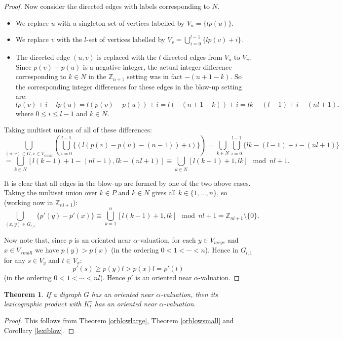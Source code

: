 \documentclass[12pt, a4paper]{article}
\newtheorem{theorem}{Theorem}[section]
\theoremstyle{definition}
\begin{document}
\begin{proof}
Now consider the directed edges with labels corresponding to $N$. 
\begin{itemize}
\item We replace $u$ with a singleton set of vertices labelled by $V_u=\{lp(u)\}$.
\item We replace $v$ with the $l$-set of vertices labelled by $V_v = \bigcup_{i=0}^{l-1}\{lp(v)+i\}$.
\item  The directed edge $(u,v)$ is replaced with the $l$ directed edges from $V_u$ to $V_v$.  Since $p(v)-p(u)$ is a negative integer, the actual integer difference corresponding to $k \in N$ in the $\mathbb{Z}_{n+1}$ setting was in fact $-(n+1-k)$.  So the corresponding integer differences for these edges in the blow-up setting are:
\[lp(v)+i-lp(u)=l(p(v)-p(u))+i = l(-(n+1-k))+i=lk-(l-1)+i-(nl+1).\]
where $0 \leq i \leq l-1$ and $k \in N$.  
\end{itemize}
Taking multiset unions of all of these differences:
\[
\bigcup_{(u,v) \in G, v \in V_{small}} \left( \bigcup_{i=0}^{l-1} \{ (l(p(v)-p(u)-(n-1))+i) \} \right)
= \bigcup_{k\in N} \bigcup_{i=0}^{l-1} \{ lk-(l-1)+i-(nl+1) \}\]
\[= \bigcup_{k \in N}[l(k-1)+1-(nl+1),lk-(nl+1)] \equiv \bigcup_{k \in N}[l(k-1)+1,lk]\mod nl+1. \]

It is clear that all edges in the blow-up are formed by one of the two above cases. Taking the multiset union over $k \in P$ and $k \in N$ gives all $k \in \{1, \ldots ,n \}$, so (working now in $\mathbb{Z}_{nl+1}$):
\[\bigcup_{(x,y) \in G_{l,1}} \{p'(y)-p'(x)\} \equiv \bigcup_{k=1}^n[l(k-1)+1,lk] \mod nl+1 = \mathbb{Z}_{nl+1} \setminus \{0\}.\]

Now note that, since $p$ is an oriented near $\alpha$-valuation, for each $ y \in V_{large}$ and $x \in V_{small}$ we have $p(y) > p(x)$ (in the ordering $0<1< \cdots < n$). Hence in $G_{l,1}$ for any $s \in V_y$ and $t \in V_x$:
    \[p'(s) \geq p(y)l >   p(x)l = p'(t)\]
(in the ordering $0<1< \cdots< nl$).
Hence $p'$ is an oriented near $\alpha$-valuation.

\end{proof}

\begin{theorem}\label{lexiorblow}
If a digraph $G$ has an oriented near $\alpha$-valuation, then its lexicographic product with $K^c_l$ has an oriented near $\alpha$-valuation.
\end{theorem}
\begin{proof}
    This follows from Theorem \ref{orblowlarge}, Theorem \ref{orblowsmall} and Corollary \ref{lexiblow}.
\end{proof}
\end{document}
